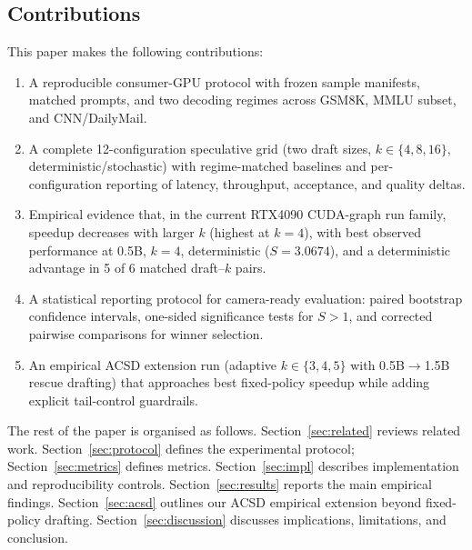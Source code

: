 \subsection{Contributions}
\label{sec:contributions}

This paper makes the following contributions:
\begin{enumerate}\itemsep0pt
  \item A reproducible consumer-GPU protocol with frozen sample manifests,
        matched prompts, and two decoding regimes across GSM8K, MMLU subset,
        and CNN/DailyMail.
  \item A complete 12-configuration speculative grid (two draft sizes,
        $k\in\{4,8,16\}$, deterministic/stochastic) with regime-matched
        baselines and per-configuration reporting of latency, throughput,
        acceptance, and quality deltas.
  \item Empirical evidence that, in the current RTX4090 CUDA-graph run family,
        speedup decreases with larger $k$ (highest at $k{=}4$), with best
        observed performance at 0.5B, $k{=}4$, deterministic ($S{=}3.0674$),
        and a deterministic advantage in 5 of 6 matched draft--$k$ pairs.
  \item A statistical reporting protocol for camera-ready evaluation: paired
        bootstrap confidence intervals, one-sided significance tests for
        $S{>}1$, and corrected pairwise comparisons for winner selection.
  \item An empirical ACSD extension run (adaptive $k\in\{3,4,5\}$ with
        0.5B$\rightarrow$1.5B rescue drafting) that approaches best fixed-policy
        speedup while adding explicit tail-control guardrails.
\end{enumerate}

The rest of the paper is organised as follows. Section~\ref{sec:related}
reviews related work. Section~\ref{sec:protocol} defines the experimental
protocol; Section~\ref{sec:metrics} defines metrics. Section~\ref{sec:impl}
describes implementation and reproducibility controls. Section~\ref{sec:results}
reports the main empirical findings. Section~\ref{sec:acsd} outlines
our ACSD empirical extension beyond fixed-policy drafting. Section~\ref{sec:discussion}
discusses implications, limitations, and conclusion.
